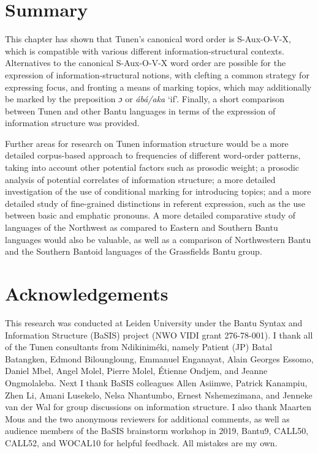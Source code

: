 \documentclass[output=paper,colorlinks,citecolor=brown
]{langscibook}
\begin{document}
\section{Summary}\label{secconc}
This chapter has shown that Tunen's canonical word order is S-Aux-O-V-X, which is compatible with various different information-structural contexts. Alternatives to the canonical S-Aux-O-V-X word order are possible for the expression of information-structural notions, with clefting a common strategy for expressing focus, and fronting a means of marking topics, which may additionally be marked by the preposition \textit{ɔ} or \textit{ábá/aka} `if'. Finally, a short comparison between Tunen and other Bantu languages in terms of the expression of information structure was provided.

Further areas for research on Tunen information structure would be a more detailed corpus-based approach to frequencies of different word-order patterns, taking into account other potential factors such as prosodic weight; a prosodic analysis of potential correlates of information structure; a more detailed investigation of the use of conditional marking for introducing topics; and a more detailed study of fine-grained distinctions in referent expression, such as the use between basic and emphatic pronouns. A more detailed comparative study of languages of the Northwest as compared to Eastern and Southern Bantu languages would also be valuable, as well as a comparison of Northwestern Bantu and the Southern Bantoid languages of the Grassfields Bantu group.

\section*{Acknowledgements}
This research was conducted at Leiden University under the Bantu Syntax and Information Structure (BaSIS) project (NWO VIDI grant 276-78-001). I thank all of the Tunen consultants from Ndikiniméki, namely Patient (JP) Batal Batangken, Edmond Biloungloung, Emmanuel Enganayat, Alain Georges Essomo, Daniel Mbel, Angel Molel, Pierre Molel, Étienne Ondjem, and Jeanne Ongmolaleba. Next I thank BaSIS colleagues Allen Asiimwe, Patrick Kanampiu, Zhen Li, Amani Lusekelo, Nelsa Nhantumbo, Ernest Nshemezimana, and Jenneke van der Wal for group discussions on information structure. I also thank Maarten Mous and the two anonymous reviewers for additional comments, as well as audience members of the BaSIS brainstorm workshop in 2019, Bantu9, CALL50, CALL52, and WOCAL10 for helpful feedback. All mistakes are my own.
\end{document}
